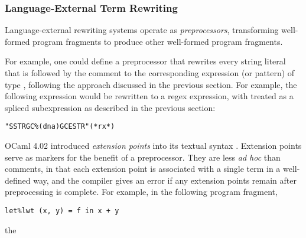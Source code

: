 {\subsubsection{Language-External Term Rewriting}
Language-external rewriting systems operate as \emph{preprocessors}, transforming well-formed program fragments to produce other well-formed program fragments.

For example, one could define a preprocessor that rewrites every string literal that is followed by the comment  to the corresponding expression (or pattern) of type , following the approach discussed in the previous section. For example, the following expression would be rewritten to a regex expression, with  treated as a spliced subexpression as described in the previous section:
\begin{lstlisting}[numbers=none]
"SSTRGC%(dna)GCESTR"(*rx*)
\end{lstlisting}

OCaml 4.02 introduced \emph{extension points} into its textual syntax \cite{ocaml-manual-4.02}. Extension points serve as markers for the benefit of a preprocessor. They are less \emph{ad hoc} than comments, in that each extension point is associated with a single term in a well-defined way, and the compiler gives an error if any extension points remain after preprocessing is complete. For example, in the following program fragment, 
\begin{lstlisting}[numbers=none]
let%lwt (x, y) = f in x + y
\end{lstlisting}
the \li{%
annotation on the let expression causes a preprocessor distributed with \li{Lwt}, a lightweight threading library, to rewrite this fragment to:
\begin{lstlisting}[numbers=none]
Lwt.bind f (fun (x, y) -> x + y)
\end{lstlisting}
The OCaml system is distributed with a library called \li{ppx_tools} that simplifies the task of writing  preprocessors that operate on terms annotated with extension points.

These systems have nearly all of the same conceptual problems as dialect-oriented systems do. \todo{elaborate on this}

\subsubsection{Macro Systems}
Macro systems allow programmers to designate functions that operate over term encodings as macros, and then apply these macros directly to terms. \todo{search is solved. delimitation is solved. conflict is solved.}

}}
